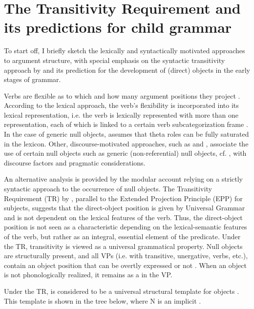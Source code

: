 \documentclass[output=paper,modfonts,newtxmath,hidelinks,]{langscibook}
\begin{document}
\section{The Transitivity Requirement and its predictions for child grammar}\label{17:sec:key:2}

To start off, I briefly sketch the lexically and syntactically motivated approaches to argument structure, with special emphasis on the syntactic transitivity approach by \citet{Cummins-Roberge2005} and its prediction for the development of (direct) objects in the early stages of grammar.

Verbs are flexible as to which and how many argument positions they project \citep[25]{VanHout2012}. According to the lexical approach, the verb’s flexibility is incorporated into its lexical representation, i.e. the verb is lexically represented with more than one representation, each of which is linked to a certain verb subcategorization frame \citep{Chomsky1965,Emonds1991}. In the case of  generic null objects, \citet{Rizzi1986} assumes that theta roles can be fully saturated in the lexicon. Other, discourse-motivated approaches, such as \citet{Groefsema1995} and \citet{Fellbaum-Kegl1989}, associate the use of certain null objects such as generic (non-referential) null objects, cf. , with discourse factors and pragmatic considerations.

An alternative analysis is provided by the modular account relying on a strictly syntactic approach to the occurrence of null objects. The Transitivity Requirement (TR) by \citet{Cummins-Roberge2005}, parallel to the Extended Projection Principle (EPP) for subjects, suggests that the direct-object position is given by Universal Grammar and is not dependent on the lexical features of the verb. Thus, the direct-object position is not seen as a characteristic depending on the lexical-semantic features of the verb, but rather as an integral, essential element of the predicate. Under the TR, transitivity is viewed as a universal grammatical property. Null objects are structurally present, and all VPs (i.e. with transitive, unergative,  verbs, etc.), contain an object position that can be overtly expressed or not \citep{Cummins-Roberge2005}. When an object is not phonologically realized, it remains as a  in the VP.

Under the TR,  is considered to be a universal structural template for objects \citep{Cummins-Roberge2005,Perez-Leroux-etal2008}. This template is shown in the tree below, where N is an implicit .
\end{document}
